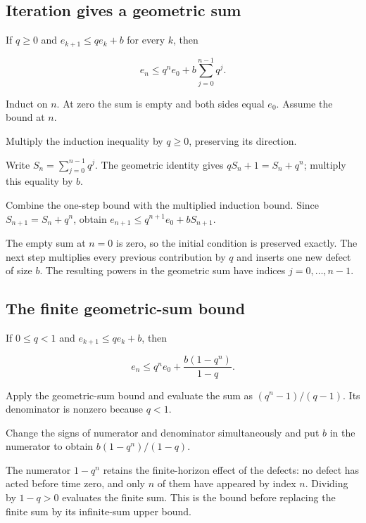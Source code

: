 \documentclass[11pt,a4paper]{article}
\begin{document}
\subsection{\texorpdfstring{Iteration gives a geometric sum}{Iteration gives a geometric sum}}


If \(q\ge0\) and \(e_{k+1}\le qe_k+b\) for every \(k\), then

\[e_n\le q^ne_0+b\sum_{j=0}^{n-1}q^j.\]

Induct on \(n\). At zero the sum is empty and both sides equal \(e_0\). Assume the bound at \(n\).



Multiply the induction inequality by \(q\ge0\), preserving its direction.



Write \(S_n=\sum_{j=0}^{n-1}q^j\). The geometric identity gives \(qS_n+1=S_n+q^n\); multiply this equality by \(b\).



Combine the one-step bound with the multiplied induction bound. Since \(S_{n+1}=S_n+q^n\), obtain \(e_{n+1}\le q^{n+1}e_0+bS_{n+1}\).



The empty sum at \(n=0\) is zero, so the initial condition is preserved exactly. The next step multiplies every previous contribution by \(q\) and inserts one new defect of size \(b\). The resulting powers in the geometric sum have indices \(j=0,\ldots,n-1\).


\subsection{\texorpdfstring{The finite geometric-sum bound}{The finite geometric-sum bound}}


If \(0\le q<1\) and \(e_{k+1}\le qe_k+b\), then

\[e_n\le q^ne_0+\frac{b(1-q^n)}{1-q}.\]

Apply the geometric-sum bound and evaluate the sum as \((q^n-1)/(q-1)\). Its denominator is nonzero because \(q<1\).



Change the signs of numerator and denominator simultaneously and put \(b\) in the numerator to obtain \(b(1-q^n)/(1-q)\).



The numerator \(1-q^n\) retains the finite-horizon effect of the defects: no defect has acted before time zero, and only \(n\) of them have appeared by index \(n\). Dividing by \(1-q>0\) evaluates the finite sum. This is the bound before replacing the finite sum by its infinite-sum upper bound.
\end{document}
